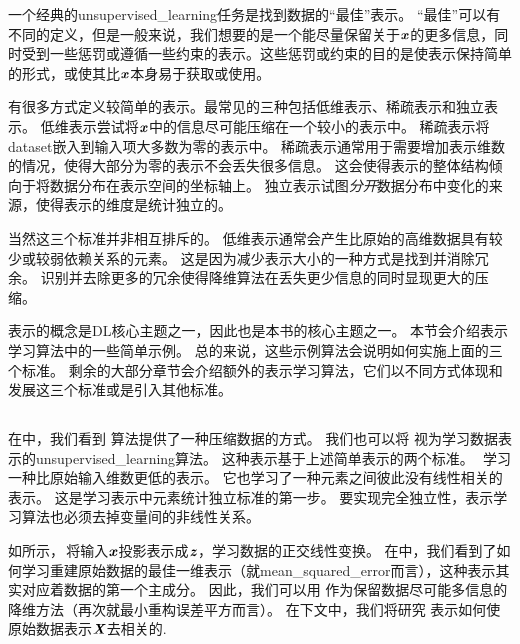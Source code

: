一个经典的\gls{unsupervised_learning}任务是找到数据的``最佳''表示。
``最佳''可以有不同的定义，但是一般来说，我们想要的是一个能尽量保留关于$\boldsymbol{\mathit{x}}$的更多信息，同时受到一些惩罚或遵循一些约束的表示。这些惩罚或约束的目的是使表示保持简单的形式，或使其比$\boldsymbol{\mathit{x}}$本身易于获取或使用。 


有很多方式定义较简单的表示。最常见的三种包括低维表示、稀疏表示和独立表示。
低维表示尝试将$\boldsymbol{\mathit{x}}$中的信息尽可能压缩在一个较小的表示中。
稀疏表示将\gls{dataset}嵌入到输入项大多数为零的表示中\citep{Barlow89,Olshausen+Field-1996,Hinton+Ghahramani-97}。
稀疏表示通常用于需要增加表示维数的情况，使得大部分为零的表示不会丢失很多信息。
这会使得表示的整体结构倾向于将数据分布在表示空间的坐标轴上。
独立表示试图\emph{分开}数据分布中变化的来源，使得表示的维度是统计独立的。

当然这三个标准并非相互排斥的。
低维表示通常会产生比原始的高维数据具有较少或较弱依赖关系的元素。
这是因为减少表示大小的一种方式是找到并消除冗余。
识别并去除更多的冗余使得降维算法在丢失更少信息的同时显现更大的压缩。

表示的概念是\gls{DL}核心主题之一，因此也是本书的核心主题之一。
本节会介绍表示学习算法中的一些简单示例。
总的来说，这些示例算法会说明如何实施上面的三个标准。
剩余的大部分章节会介绍额外的表示学习算法，它们以不同方式体现和发展这三个标准或是引入其他标准。

\subsection{}
\label{sec:principal_components_analysis_chap5}
在中，我们看到\,\,算法提供了一种压缩数据的方式。
我们也可以将\,\,视为学习数据表示的\gls{unsupervised_learning}算法。
这种表示基于上述简单表示的两个标准。
\,\,学习一种比原始输入维数更低的表示。
它也学习了一种元素之间彼此没有线性相关的表示。
这是学习表示中元素统计独立标准的第一步。
要实现完全独立性，表示学习算法也必须去掉变量间的非线性关系。


如所示，\,将输入$\boldsymbol{\mathit{x}}$投影表示成$\boldsymbol{\mathit{z}}$，学习数据的正交线性变换。
在中，我们看到了如何学习重建原始数据的最佳一维表示（就\gls{mean_squared_error}而言），这种表示其实对应着数据的第一个主成分。
因此，我们可以用\,\,作为保留数据尽可能多信息的降维方法（再次就最小重构误差平方而言）。
在下文中，我们将研究\,\,表示如何使原始数据表示$\boldsymbol{\mathit{X}}$去相关的.

